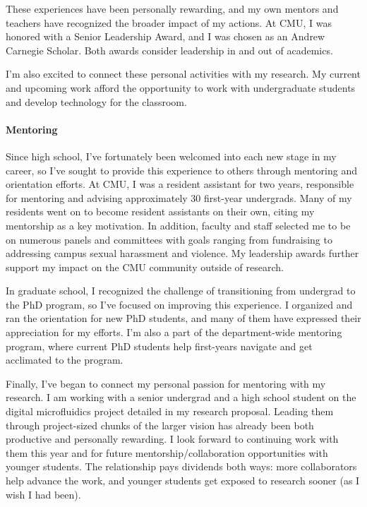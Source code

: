 \documentclass[12pt]{article}
\begin{document}
These experiences have been personally rewarding, and my own mentors and teachers have recognized the broader impact of my actions.
At CMU, I was honored with a Senior Leadership Award, and I was chosen as an Andrew Carnegie Scholar.
Both awards consider leadership in and out of academics.

I'm also excited to connect these personal activities with my research.
My current and upcoming work afford the opportunity to work with undergraduate students and develop technology for the classroom.

\paragraph{Mentoring}
Since high school, I've fortunately been welcomed into each new stage in my career, so I've sought to provide this experience to others through mentoring and orientation efforts.
At CMU, I was a resident assistant for two years, responsible for mentoring and advising approximately 30 first-year undergrads.
Many of my residents went on to become resident assistants on their own, citing my mentorship as a key motivation.
In addition, faculty and staff selected me to be on numerous panels and committees with goals ranging from fundraising to addressing campus sexual harassment and violence.
My leadership awards further support my impact on the CMU community outside of research.

In graduate school, I recognized the challenge of transitioning from undergrad to the PhD program, so I've focused on improving this experience.
I organized and ran the orientation for new PhD students, and many of them have expressed their appreciation for my efforts.
I'm also a part of the department-wide mentoring program, where current PhD students help first-years navigate and get acclimated to the program.

Finally, I've began to connect my personal passion for mentoring with my research.
I am working with a senior undergrad and a high school student on the digital microfluidics project detailed in my research proposal.
Leading them through project-sized chunks of the larger vision has already been both productive and personally rewarding.
I look forward to continuing work with them this year and for future mentorship/collaboration opportunities with younger students.
The relationship pays dividends both ways: more collaborators help advance the work, and younger students get exposed to research sooner (as I wish I had been).
\end{document}
